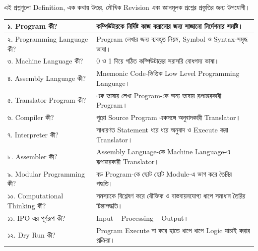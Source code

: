 
এই প্রশ্নগুলো Definition, এক কথায় উত্তর, মৌখিক Revision এবং
জ্ঞানমূলক প্রশ্নের প্রস্তুতির জন্য উপযোগী।

\begin{longtable}{
|L{0.33\textwidth}
|L{0.59\textwidth}|
}

\endfirsthead

\endhead

১. Program কী?
&
কম্পিউটারকে নির্দিষ্ট কাজ করানোর জন্য সাজানো নির্দেশনার সমষ্টি।
\\
\hline

২. Programming Language কী?
&
Program লেখার জন্য ব্যবহৃত নিয়ম, Symbol ও Syntax-সমৃদ্ধ ভাষা।
\\
\hline

৩. Machine Language কী?
&
0 ও 1 দিয়ে গঠিত কম্পিউটারের সরাসরি বোধগম্য ভাষা।
\\
\hline

৪. Assembly Language কী?
&
Mnemonic Code-ভিত্তিক Low Level Programming Language।
\\
\hline

৫. Translator Program কী?
&
এক ভাষায় লেখা Program-কে অন্য ভাষায় রূপান্তরকারী Program।
\\
\hline

৬. Compiler কী?
&
পুরো Source Program একসঙ্গে অনুবাদকারী Translator।
\\
\hline

৭. Interpreter কী?
&
সাধারণত Statement ধরে ধরে অনুবাদ ও Execute করা Translator।
\\
\hline

৮. Assembler কী?
&
Assembly Language-কে Machine Language-এ রূপান্তরকারী Translator।
\\
\hline

৯. Modular Programming কী?
&
বড় Program-কে ছোট ছোট Module-এ ভাগ করে তৈরির পদ্ধতি।
\\
\hline

১০. Computational Thinking কী?
&
সমস্যাকে বিশ্লেষণ করে যৌক্তিক ও বাস্তবায়নযোগ্য ধাপে সমাধান তৈরির চিন্তাপদ্ধতি।
\\
\hline

১১. IPO-এর পূর্ণরূপ কী?
&
Input -- Processing -- Output।
\\
\hline

১২. Dry Run কী?
&
Program Execute না করে হাতে ধাপে ধাপে Logic যাচাই করার প্রক্রিয়া।
\\
\hline


\end{longtable}
